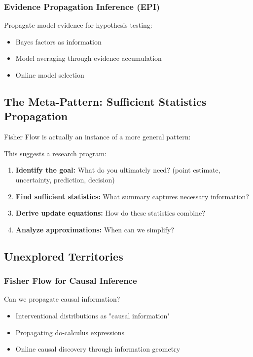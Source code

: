 \documentclass[11pt]{article}
\begin{document}
\subsubsection{Evidence Propagation Inference (EPI)}
Propagate model evidence for hypothesis testing:
\begin{itemize}
\item Bayes factors as information
\item Model averaging through evidence accumulation
\item Online model selection
\end{itemize}

\subsection{The Meta-Pattern: Sufficient Statistics Propagation}

Fisher Flow is actually an instance of a more general pattern:

\begin{center}
\end{center}

This suggests a research program:
\begin{enumerate}
\item \textbf{Identify the goal:} What do you ultimately need? (point estimate, uncertainty, prediction, decision)
\item \textbf{Find sufficient statistics:} What summary captures necessary information?
\item \textbf{Derive update equations:} How do these statistics combine?
\item \textbf{Analyze approximations:} When can we simplify?
\end{enumerate}

\subsection{Unexplored Territories}

\subsubsection{Fisher Flow for Causal Inference}
Can we propagate causal information?
\begin{itemize}
\item Interventional distributions as "causal information"
\item Propagating do-calculus expressions
\item Online causal discovery through information geometry
\end{itemize}
\end{document}

